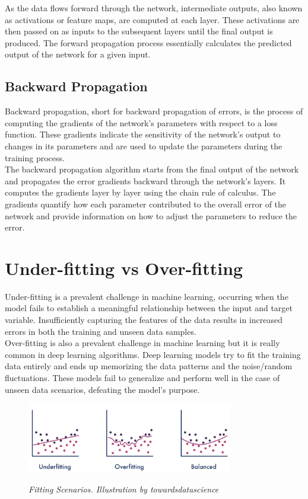 As the data flows forward through the network, intermediate outputs, also known as activations or feature maps, are computed at each layer. These activations are then passed on as inputs to the subsequent layers until the final output is produced. The forward propagation process essentially calculates the predicted output of the network for a given input.

\subsection{Backward Propagation}

Backward propagation, short for backward propagation of errors, is the process of computing the gradients of the network's parameters with respect to a loss function. These gradients indicate the sensitivity of the network's output to changes in its parameters and are used to update the parameters during the training process. \\

The backward propagation algorithm starts from the final output of the network and propagates the error gradients backward through the network's layers. It computes the gradients layer by layer using the chain rule of calculus. The gradients quantify how each parameter contributed to the overall error of the network and provide information on how to adjust the parameters to reduce the error.


\section{Under-fitting vs Over-fitting}

Under-fitting is a prevalent challenge in machine learning, occurring when the model fails to establish a meaningful relationship between the input and target variable. Insufficiently capturing the features of the data results in increased errors in both the training and unseen data samples. \\

Over-fitting is also a prevalent challenge in machine learning but it is really common in deep learning algorithms. Deep learning models try to fit the training data entirely and ends up memorizing the data patterns and the noise/random fluctuations. These models fail to generalize and perform well in the case of unseen data scenarios, defeating the model's purpose. \\

\begin{figure}[H]
\centering
\includegraphics[width=0.8\textwidth]{imatges/preliminaries/over-under-base.jpg}
\caption[Fitting Scenarios]{\textit{Fitting Scenarios. Illustration by towardsdatascience}}
{\label{fig:underfitting-overfitting-goodfitting}}
\end{figure}

